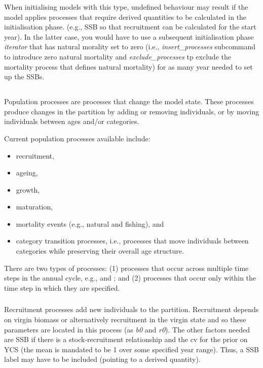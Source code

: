 When initialising models with this type, undefined behaviour may result if the model applies processes that require derived quantities to be calculated in the initialisation phase. (e.g., SSB so that recruitment can be calculated for the start year). In the latter case, you would have to use a subsequent initialisation phase \textit{iterator} that has natural morality set to zero (i.e., \textit{insert\_processes} subcommand to introduce zero natural mortality and \textit{exclude\_processes} tp exclude the mortality process that defines natural mortality) for as many year needed to set up the SSBs.


\subsection{}\label{sec:Population processes}

Population processes are processes that change the model state. These processes produce changes in the partition by adding or removing individuals, or by moving individuals between ages and/or categories.

Current population processes available include:

\begin{itemize}
\item recruitment,
\item ageing,
\item growth,
\item maturation,
\item mortality events (e.g., natural and fishing), and
\item category transition processes, i.e., processes that move individuals between categories while preserving their overall age structure.
\end{itemize}

There are two types of processes: (1) processes that occur across multiple time steps in the annual cycle, e.g.,  and ; and (2) processes that occur only within the time step in which they are specified. 

\subsubsection{}

Recruitment processes  add new individuals to the partition. Recruitment depends on virgin biomass or alternatively recruitment in the virgin state and so these parameters are located in this process (as \textit{b0}
 and \textit{r0}). The other factors needed are SSB if there is a stock-recruitment relationship and the cv for the prior on YCS (the mean is mandated to be 1 over some specified year range). Thus, a SSB label may have to be included (pointing to a derived quantity).
 

